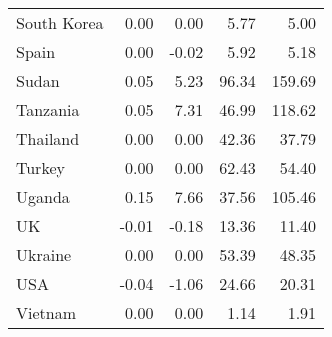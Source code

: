 \begin{table}[b]
\begin{tabular}[t]{lrrrr}
South Korea & 0.00 & 0.00 & 5.77 & 5.00\\
Spain & 0.00 & -0.02 & 5.92 & 5.18\\
Sudan & 0.05 & 5.23 & 96.34 & 159.69\\
Tanzania & 0.05 & 7.31 & 46.99 & 118.62\\
Thailand & 0.00 & 0.00 & 42.36 & 37.79\\
Turkey & 0.00 & 0.00 & 62.43 & 54.40\\
Uganda & 0.15 & 7.66 & 37.56 & 105.46\\
UK & -0.01 & -0.18 & 13.36 & 11.40\\
Ukraine & 0.00 & 0.00 & 53.39 & 48.35\\
USA & -0.04 & -1.06 & 24.66 & 20.31\\
Vietnam & 0.00 & 0.00 & 1.14 & 1.91\\
\bottomrule
\end{tabular}
\end{table}
